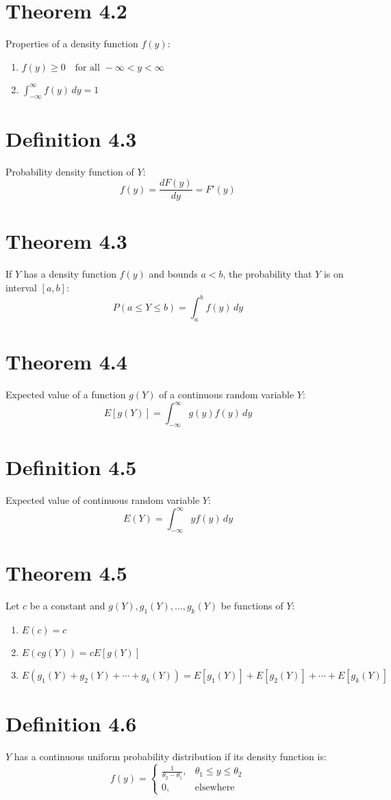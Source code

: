 \documentclass[12pt]{article}
\begin{document}
\section{Theorem 4.2}
Properties of a density function $f(y)$:
\begin{enumerate}
  \item $f(y) \geq 0 \quad \text{for all } -\infty < y < \infty$
  \item $\int_{-\infty}^{\infty} f(y)\,dy = 1$
\end{enumerate}

\section{Definition 4.3}
Probability density function of $Y$:
\[
f(y) = \frac{dF(y)}{dy} = F'(y)
\]

\section{Theorem 4.3}
If $Y$ has a density function $f(y)$ and bounds $a < b$, the probability that $Y$ is on interval $[a, b]$:
\[
P(a \leq Y \leq b) = \int_a^b f(y)\,dy
\]

\section{Theorem 4.4}
Expected value of a function $g(Y)$ of a continuous random variable $Y$:
\[
E[g(Y)] = \int_{-\infty}^{\infty} g(y) f(y)\,dy
\]

\section{Definition 4.5}
Expected value of continuous random variable $Y$:
\[
E(Y) = \int_{-\infty}^{\infty} y f(y)\,dy
\]

\section{Theorem 4.5}
Let $c$ be a constant and $g(Y), g_1(Y), \ldots, g_k(Y)$ be functions of $Y$:
\begin{enumerate}
  \item $E(c) = c$
  \item $E(cg(Y)) = cE[g(Y)]$
  \item $E(g_1(Y) + g_2(Y) + \cdots + g_k(Y)) = E[g_1(Y)] + E[g_2(Y)] + \cdots + E[g_k(Y)]$
\end{enumerate}

\section{Definition 4.6}
$Y$ has a continuous uniform probability distribution if its density function is:
\[
f(y) = \begin{cases} \frac{1}{\theta_2 - \theta_1}, & \theta_1 \leq y \leq \theta_2 \\ 0, & \text{elsewhere} \end{cases}
\]
\end{document}
